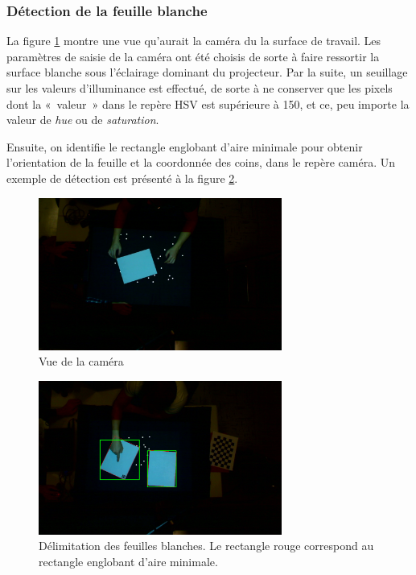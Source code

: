 \documentclass[11pt]{report}
\begin{document}
\subsubsection{Détection de la feuille blanche}
La figure \ref{feuille_blanche} montre une vue qu'aurait la caméra du la surface
de travail. Les paramètres de saisie de la caméra ont été choisis de sorte à
faire ressortir la surface blanche sous l'éclairage dominant du projecteur. Par
la suite, un seuillage sur les valeurs d'illuminance est effectué, de sorte à ne
conserver que les pixels dont la « valeur » dans le repère HSV est supérieure à
150, et ce, peu importe la valeur de \textit{hue} ou de \textit{saturation}.

Ensuite, on identifie le rectangle englobant d'aire minimale pour obtenir
l'orientation de la feuille et la coordonnée des coins, dans le repère caméra.
Un exemple de détection est présenté à la figure \ref{detection_feuille}.

\begin{figure}[h]
  \centering
  \includegraphics[width=8cm]{feuille-blanche.jpg}
  \caption{Vue de la caméra}
  \label{feuille_blanche}
\end{figure}

\begin{figure}[h]
  \centering
  \includegraphics[width=8cm]{localisation-feuille.png}
  \caption{Délimitation des feuilles blanches.
    Le rectangle rouge correspond au rectangle englobant d'aire minimale.}
  \label{detection_feuille}
\end{figure}
\end{document}
